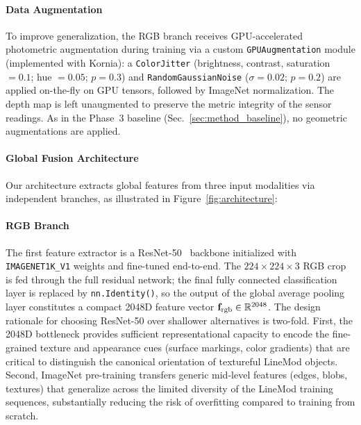 \paragraph{Data Augmentation}
To improve generalization, the RGB branch receives GPU-accelerated photometric augmentation during training via a custom \texttt{GPUAugmentation} module (implemented with Kornia): a \texttt{ColorJitter} (brightness, contrast, saturation $=0.1$; hue $=0.05$; $p=0.3$) and \texttt{RandomGaussianNoise} ($\sigma=0.02$; $p=0.2$) are applied on-the-fly on GPU tensors, followed by ImageNet normalization. The depth map is left unaugmented to preserve the metric integrity of the sensor readings. As in the Phase~3 baseline (Sec.~\ref{sec:method_baseline}), no geometric augmentations are applied.

\paragraph{Global Fusion Architecture}
Our architecture extracts global features from three input modalities via independent branches, as illustrated in Figure~\ref{fig:architecture}:

\paragraph{RGB Branch}
The first feature extractor is a ResNet-50~\cite{he2016deep} backbone initialized with \texttt{IMAGENET1K\_V1} weights and fine-tuned end-to-end.
The $224\!\times\!224\!\times\!3$ RGB crop is fed through the full residual network; the final fully connected classification layer is replaced by \texttt{nn.Identity()}, so the output of the global average pooling layer constitutes a compact 2048D feature vector $\mathbf{f}_{\text{rgb}} \in \mathbb{R}^{2048}$.
The design rationale for choosing ResNet-50 over shallower alternatives is two-fold.
First, the 2048D bottleneck provides sufficient representational capacity to encode the fine-grained texture and appearance cues (surface markings, color gradients) that are critical to distinguish the canonical orientation of textureful LineMod objects.
Second, ImageNet pre-training transfers generic mid-level features (edges, blobs, textures) that generalize across the limited diversity of the LineMod training sequences, substantially reducing the risk of overfitting compared to training from scratch.

